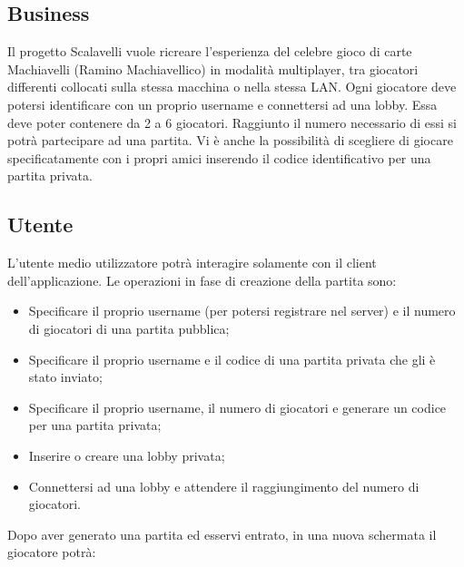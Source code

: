 \subsection{Business}\label{subsec:business}
Il progetto Scalavelli vuole ricreare l’esperienza del celebre gioco di carte Machiavelli (Ramino Machiavellico) in modalità multiplayer, tra giocatori differenti collocati sulla stessa macchina o nella stessa LAN. Ogni giocatore deve potersi identificare con un proprio username e connettersi ad una lobby.
Essa deve poter contenere da 2 a 6 giocatori.
Raggiunto il numero necessario di essi si potrà partecipare ad una partita.
Vi è anche la possibilità di scegliere di giocare specificatamente con i propri amici inserendo il codice identificativo per una partita privata.

\subsection{Utente}\label{subsec:utente}
L’utente medio utilizzatore potrà interagire solamente con il client dell’applicazione.
Le operazioni in fase di creazione della partita sono:
\begin{itemize}
    \item Specificare il proprio username (per potersi registrare nel server) e il numero di giocatori di una partita pubblica;
    \item Specificare il proprio username e il codice di una partita privata che gli è stato inviato;
    \item Specificare il proprio username, il numero di giocatori e generare un codice per una partita privata;
    \item Inserire o creare una lobby privata;
    \item Connettersi ad una lobby e attendere il raggiungimento del numero di giocatori.
\end{itemize}
Dopo aver generato una partita ed esservi entrato, in una nuova schermata il giocatore potrà:
